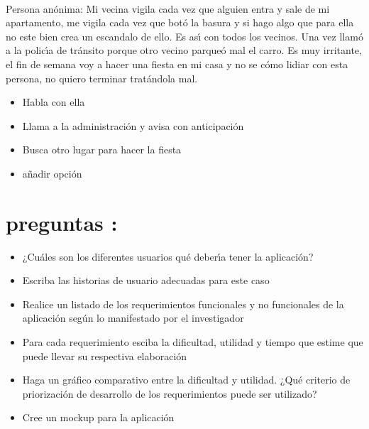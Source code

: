 \documentclass[10pt,a4paper]{article} %
\begin{document}
        \\ Persona anónima: Mi vecina vigila cada vez que alguien entra y sale de mi apartamento, me vigila
        cada vez que botó la basura y si hago algo que para ella no este bien crea un escandalo de ello. Es
        ası́ con todos los vecinos. Una vez llamó a la policı́a de tránsito porque otro vecino parqueó mal el
        carro. Es muy irritante, el fin de semana voy a hacer una fiesta en mi casa y no se cómo lidiar con
        esta persona, no quiero terminar tratándola mal.

        \begin{itemize}
            \item {Habla con ella}
            \item {Llama a la administración y avisa con anticipación}
            \item {Busca otro lugar para hacer la fiesta}
            \item {añadir opción}
        \end{itemize}

    \section{preguntas :}
        \begin{itemize}
            \item {¿Cuáles son los diferentes usuarios qué deberı́a tener la aplicación?}
            \item {Escriba las historias de usuario adecuadas para este caso}
            \item {Realice un listado de los requerimientos funcionales y no
                funcionales de la aplicación según lo manifestado por el
                investigador}
            \item {Para cada requerimiento esciba la dificultad, utilidad y
                tiempo que estime que puede llevar su respectiva elaboración}
            \item {Haga un gráfico comparativo entre la dificultad y utilidad.
                ¿Qué criterio de priorización de desarrollo de los
                requerimientos puede ser utilizado?}
            \item {Cree un mockup para la aplicación}
        \end{itemize}




    \nocite{*}
    
    
\end{document}

